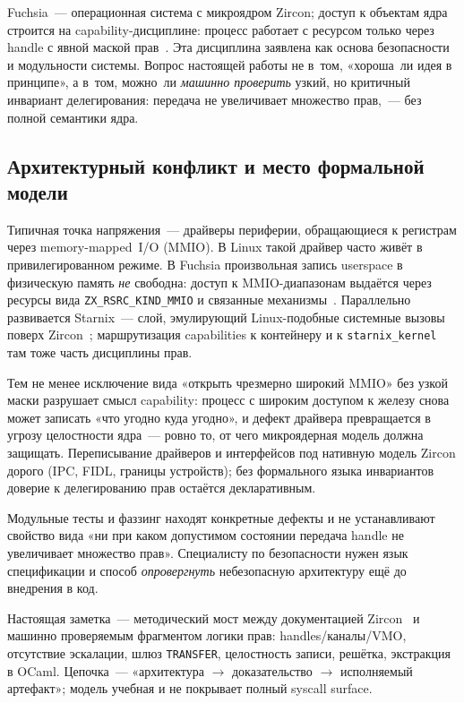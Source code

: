 \documentclass[11pt,a4paper]{article}
\begin{document}
Fuchsia~--- операционная система с микроядром Zircon; доступ к объектам
ядра строится на \textenglish{capability}-дисциплине: процесс работает с
ресурсом только через handle с явной маской
прав~\cite{zircon_handles,zircon_rights}. Эта дисциплина заявлена как
основа безопасности и модульности системы. Вопрос настоящей работы не
в~том, «хороша~ли идея в принципе», а в~том, можно~ли
\emph{машинно проверить} узкий, но критичный инвариант делегирования:
передача не увеличивает множество прав,~--- без полной семантики ядра.

\subsection{Архитектурный конфликт и место формальной модели}

Типичная точка напряжения~--- драйверы периферии, обращающиеся к
регистрам через memory-mapped~I/O (MMIO). В Linux такой драйвер часто
живёт в привилегированном режиме. В Fuchsia произвольная запись
userspace в физическую память \emph{не} свободна: доступ к MMIO-диапазонам
выдаётся через ресурсы вида \texttt{ZX\_RSRC\_KIND\_MMIO} и связанные
механизмы~\cite{zircon_mmio}. Параллельно развивается Starnix~--- слой,
эмулирующий Linux-подобные системные вызовы поверх
Zircon~\cite{zircon_starnix}; маршрутизация capabilities к контейнеру и
к \texttt{starnix\_kernel} там тоже часть дисциплины прав.

Тем не менее исключение вида «открыть чрезмерно широкий MMIO» без узкой
маски разрушает смысл \textenglish{capability}: процесс с широким доступом к
железу снова может записать «что угодно куда угодно», и дефект драйвера
превращается в угрозу целостности ядра~--- ровно то, от чего микроядерная
модель должна защищать. Переписывание драйверов и интерфейсов под
нативную модель Zircon дорого (IPC, FIDL, границы устройств); без
формального языка инвариантов доверие к делегированию прав остаётся
декларативным.

Модульные тесты и фаззинг находят конкретные дефекты и не устанавливают
свойство вида «ни при каком допустимом состоянии передача handle не
увеличивает множество прав». Специалисту по безопасности нужен язык
спецификации и способ \emph{опровергнуть} небезопасную архитектуру ещё
до внедрения в код.

Настоящая заметка~--- методический мост между документацией
Zircon~\cite{zircon_handles,zircon_rights} и машинно проверяемым
фрагментом логики прав: handles/каналы/VMO, отсутствие эскалации, шлюз
\texttt{TRANSFER}, целостность записи, решётка, экстракция в OCaml.
Цепочка~--- «архитектура $\to$ доказательство $\to$ исполняемый
артефакт»; модель учебная и не покрывает полный syscall surface.
\end{document}
